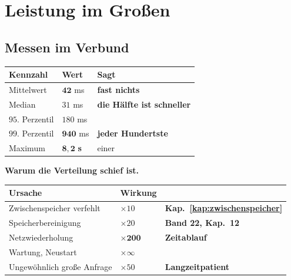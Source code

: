 \part{Leistung im Großen}

\chapter{Messen im Verbund}\label{kap:messen}

\begin{merksatz}
\begin{center}
\renewcommand{\arraystretch}{1.5}
\begin{tabular}{@{}P{2.6cm}P{2.2cm}P{3.2cm}@{}}
\toprule
\textbf{Kennzahl} & \textbf{Wert} & \textbf{Sagt}\\
\midrule
Mittelwert & $\mathbf{42}$ ms & \textcolor{akzent}{\textbf{fast nichts}}\\
Median & $31$ ms & \textbf{die Hälfte ist schneller}\\
$95.$ Perzentil & $180$ ms & \\
$99.$ Perzentil & $\mathbf{940}$ ms & \textcolor{akzent}{\textbf{jeder Hundertste}}\\
Maximum & $\mathbf{8{,}2}$ \textbf{s} & \textcolor{akzent}{einer}\\
\bottomrule
\end{tabular}
\end{center}

\begin{center}
\begin{minipage}{0.88\textwidth}
\end{minipage}
\end{center}

\textbf{Warum die Verteilung schief ist.}

\begin{center}
{\small
\renewcommand{\arraystretch}{1.45}
\begin{tabular}{@{}P{3.0cm}P{2.4cm}P{2.6cm}@{}}
\toprule
\textbf{Ursache} & \textbf{Wirkung} & \\
\midrule
Zwischenspeicher verfehlt & $\times10$ & \textbf{Kap.~\ref{kap:zwischenspeicher}}\\
Speicher\-bereinigung & $\times20$ & \textbf{Band 22, Kap.~12}\\
Netzwiederholung & \textcolor{akzent}{$\times\mathbf{200}$} & \textcolor{akzent}{\textbf{Zeitablauf}}\\
Wartung, Neustart & \textcolor{akzent}{$\times\infty$} & \\
Ungewöhnlich große Anfrage & $\times50$ & \textbf{Langzeitpatient}\\
\bottomrule
\end{tabular}}
\end{center}


\end{merksatz}

